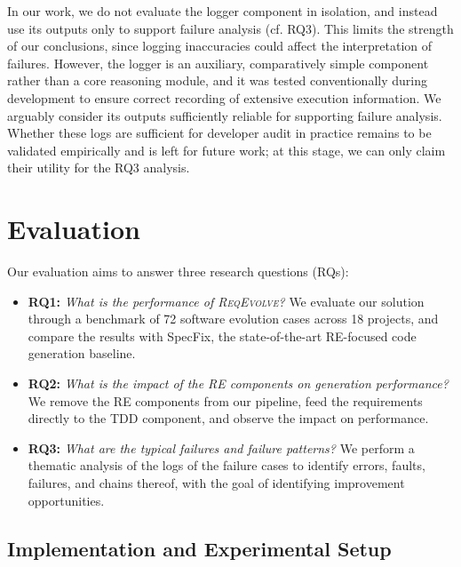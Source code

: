 \documentclass[sigconf,screen]{acmart}
\begin{document}
In our work, we do not evaluate the logger component in isolation, and instead use its outputs only to support failure analysis (cf. RQ3). This limits the strength of our conclusions, since logging inaccuracies could affect the interpretation of failures. However, the logger is an auxiliary, comparatively simple component rather than a core reasoning module, and it was tested conventionally during development to ensure correct recording of extensive execution information. We arguably consider its outputs sufficiently reliable for supporting failure analysis. Whether these logs are sufficient for developer audit in practice remains to be validated empirically and is left for future work; at this stage, we can only claim their utility for the RQ3 analysis.

\section{Evaluation}

Our evaluation aims to answer three research questions (RQs):

\begin{itemize}
    \item \textbf{RQ1:} \textit{What is the performance of \textsc{ReqEvolve}?} We evaluate our solution through a benchmark of 72 software evolution cases across 18 projects, and compare the results with SpecFix, the state-of-the-art RE-focused code generation baseline.
    \item \textbf{RQ2:} \textit{What is the impact of the RE components on generation performance?} We remove the RE components from our pipeline,  feed the requirements directly to the TDD component, and observe the impact on performance.
    \item \textbf{RQ3:} \textit{What are the typical failures and failure patterns?} We perform a thematic analysis of the logs of the failure cases to identify errors, faults, failures, and chains thereof, with the goal of identifying improvement opportunities.
\end{itemize}

\subsection{Implementation and Experimental Setup}
\end{document}
